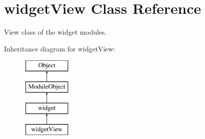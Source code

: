 \hypertarget{classwidgetView}{}\section{widget\+View Class Reference}
\label{classwidgetView}


View class of the widget modules.  


Inheritance diagram for widget\+View\+:\begin{figure}[H]
\begin{center}
\leavevmode
\includegraphics[height=4.000000cm]{classwidgetView}
\end{center}
\end{figure}
